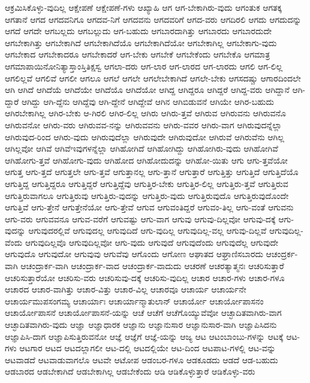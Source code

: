 {ಆಕ್ರಮಿಸಿಕೊಳ್ಳು-ವುದಿಲ್ಲ
ಆಕ್ಷೇಪಣೆ
ಆಕ್ಷೇಪಣೆ-ಗಳು
ಆಖ್ಯಾಹಿ
ಆಗ
ಆಗ-ಬೇಕಾಗಿರು-ವುದು
ಆಗಂತುಕ
ಆಗತಕ್ಕ
ಆಗತಾನೆ
ಆಗದ
ಆಗದವನಿಗೂ
ಆಗದವ-ನಿಗೆ
ಆಗದವನು
ಆಗದವರಿಗೆ
ಆಗದ-ವರು
ಆಗದಿರಲಿ
ಆಗದು
ಆಗದುದನ್ನು
ಆಗದೆ
ಆಗದೇ
ಆಗಬಲ್ಲದು
ಆಗಬಲ್ಲುದು
ಆಗ-ಬಹುದು
ಆಗಬಾರದಾಗಿತ್ತು
ಆಗಬಾರದು
ಆಗಬಾರದುದೇ
ಆಗಬೇಕಾಗಿತ್ತು
ಆಗಬೇಕಾಗಿದೆ
ಆಗಬೇಕಾಗಿದೆಯೊ
ಆಗಬೇಕಾಗಿದೆಯೋ
ಆಗಬೇಕಾಗಿಲ್ಲ
ಆಗಬೇಕಾಗು-ವುದು
ಆಗಬೇಕಾದ
ಆಗಬೇಕಾದರೂ
ಆಗಬೇಕಾದರೆ
ಆಗ-ಬೇಕು
ಆಗಬೇಕೆ
ಆಗಬೇಕೆಂದು
ಆಗಬೇಕೊ
ಆಗಮಾತ್ರ
ಆಗಮಾಪಾಯಿನೋನಿತ್ಯಾಸ್ತಾಂಸ್ತಿತಿಕ್ಷಸ್ವ
ಆಗಲಾ-ದರು
ಆಗ-ಲಾರ
ಆಗ-ಲಾರದ
ಆಗ-ಲಾರದು
ಆಗಲಿ
ಆಗ-ಲಿಲ್ಲ
ಆಗಲಿಲ್ಲವೆ
ಆಗಲಿವೆ
ಆಗಲೀ
ಆಗಲೂ
ಆಗಲೆ
ಆಗಲೇ
ಆಗಲೇಬೇಕಾಗಿದೆ
ಆಗಲೇ-ಬೇಕು
ಆಗಸದಷ್ಚು
ಆಗಾರದಿಂದಲೇ
ಆಗಿ
ಆಗಿದೆ
ಆಗಿದೆಯೆ
ಆಗಿದೆಯೇ
ಆಗಿದೆಯೊ
ಆಗಿದೆಯೋ
ಆಗಿದ್ದ
ಆಗಿದ್ದರೂ
ಆಗಿದ್ದರೆ
ಆಗಿದ್ದ-ವರು
ಆಗಿದ್ದಾನೆ
ಆಗಿ-ದ್ದಾರೆ
ಆಗಿದ್ದು
ಆಗಿ-ದ್ದೆನು
ಆಗಿದ್ದೆವು
ಆಗಿ-ದ್ದೇನೆ
ಆಗಿದ್ದೇವೆ
ಆಗಿನ
ಆಗಿಬಿಡುವನೆ
ಆಗಿಯೇ
ಆಗಿರ-ಬಹುದು
ಆಗಿರಬೇಕಾಗಿಲ್ಲ
ಆಗಿರ-ಬೇಕು
ಆ-ಗಿರಲಿ
ಆಗಿರ-ಲಿಲ್ಲ
ಆಗಿರು
ಆಗಿರು-ತ್ತವೆ
ಆಗಿರುವ
ಆಗಿರುವನು
ಆಗಿರುವನೊ
ಆಗಿರುವನೋ
ಆಗಿರು-ವರು
ಆಗಿರುವವ-ನನ್ನು
ಆಗಿರುವವನು
ಆಗಿರು-ವವರ
ಆಗಿರು-ವಾಗ
ಆಗಿರುವುದನ್ನೆಲ್ಲಾ
ಆಗಿರುವುದ-ರಿಂದ
ಆಗಿರು-ವುದು
ಆಗಿರುವುದೆಲ್ಲಾ
ಆಗಿರುವುದೇ
ಆಗಿರುವುದೋ
ಆಗಿರುವೆ
ಆಗಿರುವೆನು
ಆಗಿಲ್ಲ
ಆಗಿಲ್ಲವೋ
ಆಗಿವೆ
ಆಗಿವೆಇವುಗಳನ್ನೆಲ್ಲಾ
ಆಗಿಹೋಗಿದೆ
ಆಗಿಹೋಗಿದ್ದು
ಆಗಿಹೋಗಿರು-ವುದು
ಆಗಿಹೋಗಿವೆ
ಆಗಿಹೋಗು-ತ್ತವೆ
ಆಗಿಹೋಗು-ವುದು
ಆಗಿಹೋದ
ಆಗಿಹೋದುದನ್ನು
ಆಗಿಹೋ-ಯಿತು
ಆಗು
ಆಗು-ತ್ತವೆಯೋ
ಆಗುತ್ತ
ಆಗು-ತ್ತದೆ
ಆಗುತ್ತಲೇ
ಆಗು-ತ್ತವೆ
ಆಗುತ್ತಾನಲ್ಲ
ಆಗು-ತ್ತಾನೆ
ಆಗುತ್ತಾರೆ
ಆಗುತ್ತಿತ್ತು
ಆಗುತ್ತಿದೆ
ಆಗುತ್ತಿದೆಯೊ
ಆಗುತ್ತಿದ್ದ
ಆಗುತ್ತಿದ್ದರೂ
ಆಗುತ್ತಿದ್ದರೆ
ಆಗುತ್ತಿದ್ದೆವು
ಆಗುತ್ತಿರ-ಬೇಕು
ಆಗುತ್ತಿರ-ಲಿಲ್ಲ
ಆಗುತ್ತಿರು-ತ್ತವೆ
ಆಗುತ್ತಿರುವ
ಆಗುತ್ತಿರುವಾಗಲೂ
ಆಗುತ್ತಿರುವು
ಆಗುತ್ತಿರು-ವುದನ್ನು
ಆಗುತ್ತಿರು-ವುದು
ಆಗುತ್ತಿರುವುದೊ
ಆಗುತ್ತಿರುವುದೊಂದೇ
ಆಗುತ್ತಿವೆ
ಆಗು-ತ್ತೇನೆ
ಆಗುತ್ತೇನೆಯೋ
ಆಗು-ತ್ತೇವೆ
ಆಗುವ
ಆಗುವಂತಿದ್ದರೆ
ಆಗುವಂ-ತಿಲ್ಲ
ಆಗು-ವಂತೆ
ಆಗುವನು
ಆಗು-ವರು
ಆಗುವವನೂ
ಆಗುವ-ವರೆಗೆ
ಆಗುವಷ್ಟು
ಆಗು-ವಾಗ
ಆಗುವು
ಆಗುವು-ದಿಲ್ಲವೋ
ಆಗುವು-ದಕ್ಕೆ
ಆಗು-ವುದನ್ನು
ಆಗುವುದರಲ್ಲಿವೆ
ಆಗುವುದಲ್ಲ
ಆಗುವುದಿದೆ
ಆಗು-ವುದಿಲ್ಲ
ಆಗುವುದಿಲ್ಲ-ವಲ್ಲ
ಆಗುವು-ದಿಲ್ಲವೆ
ಆಗುವುದಿಲ್ಲ-ವೆಂದು
ಆಗುವುದಿಲ್ಲವೊ
ಆಗುವುದಿಲ್ಲವೋ
ಆಗು-ವುದು
ಆಗುವುದೆ
ಆಗುವುದೆಂದು
ಆಗುವುದೆಲ್ಲ
ಆಗುವುದೇ
ಆಗುವುದೊ
ಆಗುವುದೋ
ಆಗುವುವು
ಆಗುವೆವು
ಆಗೊಂದು
ಆಗೋಣ
ಆಘಾತದ
ಆಘ್ರಾಣಿಸಬಾರದು
ಆಚಂದ್ರರ್ಕ-ವಾಗಿ
ಆಚಂದ್ರಾರ್ಕ-ವಾಗಿ
ಆಚಂದ್ರಾರ್ಕ-ವಾದ
ಆಚಂದ್ರಾರ್ಕ-ವಾದುದು
ಆಚರಣೆ
ಆಚರತ್ಯಾತ್ಮನಃ
ಆಚರಿಸುತ್ತಾರೆ
ಆಚರಿಸುತ್ತಾರೆಯೋ
ಆಚರಿಸು-ವರು
ಆಚರಿಸುವು-ದಕ್ಕೆ
ಆಚರಿಸು-ವುದಿಲ್ಲ
ಆಚಾರ
ಆಚಾರ-ಗಳು
ಆಚಾರ-ಗಳೂ
ಆಚಾರದ
ಆಚಾರ-ವಾಗಿತ್ತು
ಆಚಾರ-ವಿತ್ತು
ಆಚಾರ-ವಿಲ್ಲ
ಆಚಾರವೂ
ಆಚಾರ್ಯ
ಆಚಾರ್ಯನೇ
ಆಚಾರ್ಯಮುಪಸಂಗಮ್ಯ
ಆಚಾರ್ಯಾಃ
ಆಚಾರ್ಯಾನ್ಮಾತುಲಾನ್
ಆಚಾರ್ಯೋ
ಆಚಾರ್ಯೋಪಾಸನಂ
ಆಚಾರ್ಯೋಪಾಸನೆ
ಆಚಾರ್ಯೋಪಾಸನೆ-ಯನ್ನು
ಆಚೆ
ಆಚೆಗೆ
ಆಚೆಗೊಯ್ಯುವೆವೋ
ಆಚ್ಛಾದಿತವಾಗಿರು-ವಾಗ
ಆಚ್ಛಾದಿತವಾಗಿರು-ವುದು
ಆಜ್ಞಾ
ಆಜ್ಞಾಧಾರಕ
ಆಜ್ಞಾನು
ಆಜ್ಞಾನುಸಾರ
ಆಜ್ಞಾನುಸಾರ-ವಾಗಿ
ಆಜ್ಞಾಪಿಸಿದನು
ಆಜ್ಞಾಪಿಸಿ-ದಾಗ
ಆಜ್ಞಾಪಿಸುತ್ತಿರುವನೋ
ಆಜ್ಞೆ
ಆಜ್ಞೆಗೆ
ಆಜ್ಞೆ-ಯನ್ನು
ಆಜ್ಯ
ಆಟ
ಆಟಂಬಾಂಬು-ಗಳನ್ನು
ಆಟಕ್ಕೆ
ಆಟ-ಗಳು
ಆಟಗಾರ
ಆಟದ
ಆಟದಲ್ಲಾಗಲೀ
ಆಟ-ದಲ್ಲಿ
ಆಟದಲ್ಲಿಯೇ
ಆಟ-ದಿಂದ
ಆಟಪಾಟ-ಗಳಲ್ಲಿ
ಆಟ-ವನ್ನು
ಆಟವಾಡದೆ
ಆಟವಾಡುವಾಗಲೊ
ಆಟವೇ
ಆಟೋಪ
ಆಡಂಬರ-ಗಳೂ
ಆಡಕೂಡದು
ಆಡದೆ
ಆಡ-ಬಹುದು
ಆಡಬಾರದ
ಆಡಬೇಕಾಗಿದೆ
ಆಡಬೇಕಾಗಿಲ್ಲ
ಆಡಬೇಕೆಂದು
ಆಡಿ
ಆಡಿಕೊಳ್ಳುತ್ತಾರೆ
ಆಡಿಕೊಳ್ಳು-ವರು
}
